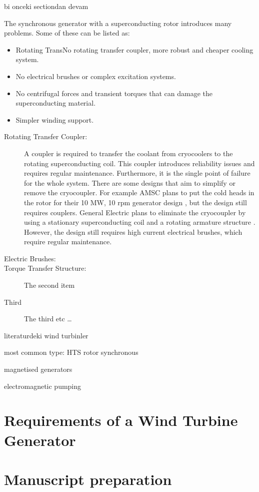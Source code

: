 \documentclass[12pt]{IET02}
\begin{document}
bi onceki sectiondan devam

The synchronous generator with a superconducting rotor introduces many problems. Some of these can be listed as:

\begin{itemize}
  \item Rotating TransNo rotating transfer coupler, more robust and cheaper cooling system.
  \item No electrical brushes or complex excitation systems.
  \item No centrifugal forces and transient torques that can damage the superconducting material.
  \item Simpler winding support.
\end{itemize}

\begin{description}
  \item[Rotating Transfer Coupler:] A coupler is required to transfer the coolant from cryocoolers to the rotating superconducting coil. This coupler introduces reliability issues and requires regular maintenance. Furthermore, it is the single point of failure for the whole system. There are some designs that aim to simplify or remove the cryocoupler. For example AMSC plans to put the cold heads in the rotor for their 10 MW, 10 rpm generator design \cite{amsc_presentation}, but the design still requires couplers. General Electric plans to eliminate the cryocoupler by using a stationary superconducting coil and a rotating armature structure \cite{Stautner2012}. However, the design still requires high current electrical brushes, which require regular maintenance.

  \item[Electric Brushes:] 
  \item[Torque Transfer Structure:] The second item
  \item[Third] The third etc \ldots
\end{description}

literaturdeki wind turbinler

most common type: HTS rotor synchronous

magnetised generators

electromagnetic pumping 

\section{Requirements of a Wind Turbine Generator}


\section{Manuscript preparation}
\end{document}
